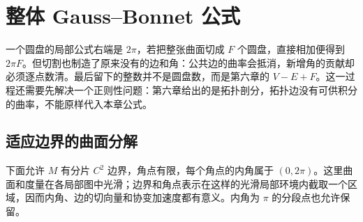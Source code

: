 
% 
% 

\section{整体 Gauss–Bonnet 公式}
\label{g1:sec:0904}

一个圆盘的局部公式右端是 \(2\pi\)，若把整张曲面切成 \(F\) 个圆盘，直接相加便得到 \(2\pi F\)。但切割也制造了原来没有的边和角：公共边的曲率会抵消，新增角的贡献却必须逐点数清。最后留下的整数并不是圆盘数，而是第六章的 \(V-E+F\)。这一过程还需要先解决一个正则性问题：第六章给出的是拓扑剖分，拓扑边没有可供积分的曲率，不能原样代入本章公式。

\subsection{适应边界的曲面分解}
\label{g1:subsec:0904:01}

下面允许 \(M\) 有分片 \(C^2\) 边界，角点有限，每个角点的内角属于 \((0,2\pi)\)。这里曲面和度量在各局部图中光滑；边界和角点表示在这样的光滑局部环境内截取一个区域，因而内角、边的切向量和协变加速度都有意义。内角为 \(\pi\) 的分段点也允许保留。

